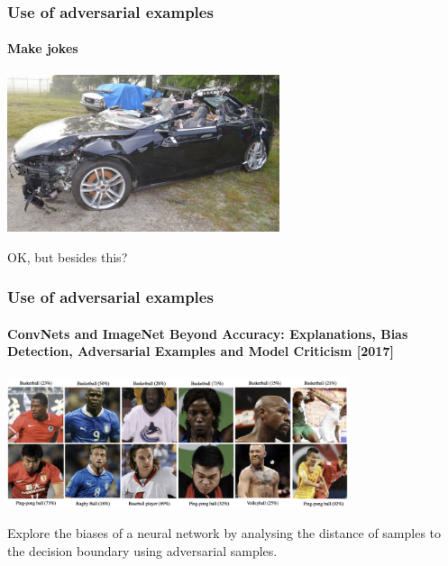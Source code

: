 \documentclass[9pt]{beamer}
\begin{document}
\begin{frame}
  \frametitle{Use of adversarial examples}

  \framesubtitle{Make jokes}

  \begin{center}
    \includegraphics[width = 8cm]{images/car_crash.jpg}
  \end{center}
  \bigskip
  OK, but besides this?
\end{frame}

\begin{frame}

  \frametitle{Use of adversarial examples}

  \framesubtitle{ConvNets and ImageNet Beyond Accuracy: Explanations,
    Bias Detection, Adversarial Examples and Model Criticism [2017]}

  \begin{center}
    \includegraphics[width = 10cm]{images/imagenet_bias.png}
  \end{center}

  \bigskip
  Explore the biases of a neural network by analysing the distance
  of samples to the decision boundary using adversarial samples.
\end{frame}
\end{document}
